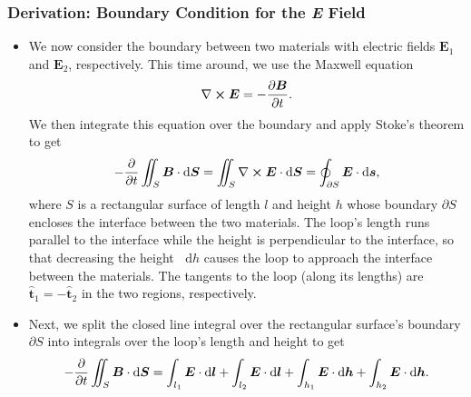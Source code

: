 \documentclass[11pt, a4paper]{article}
\newcommand{\diff}{\mathop{}\!\mathrm{d}} %
\renewcommand{\vec}[1]{\bm{#1}} %
\newcommand{\uvec}[1]{\hat{\vec{#1}}} %
\newcommand{\E}{\vec{E}} %
\newcommand{\B}{\vec{B}} %
\renewcommand{\curl}{\nabla \cross}
\begin{document}
\subsubsection{Derivation: Boundary Condition for the \textit{E} Field}
\begin{itemize}
	\item We now consider the boundary between two materials with electric fields $ \E_{1} $ and $ \E_{2} $, respectively. This time around, we use the Maxwell equation
	\begin{equation*}
		\curl \E = - \pdv{\B}{t}.
	\end{equation*}
	We then integrate this equation over the boundary and apply Stoke's theorem to get
	\begin{equation*}
        - \pdv{t}\iint_{S}\B \cdot \diff \vec{S} = \iint_{S} \curl \E \cdot \diff \vec{S} = \oint_{\partial S} \E \cdot \diff \vec{s},
	\end{equation*}
    where $ S $ is a rectangular surface of length $ l $ and height $ h $ whose boundary $ \partial S $ encloses the interface between the two materials. The loop's length runs parallel to the interface while the height is perpendicular to the interface, so that decreasing the height $ \diff h $ causes the loop to approach the interface between the materials. The tangents to the loop (along its lengths) are $ \uvec{t}_{1} = - \uvec{t}_{2} $ in the two regions, respectively. 
    
    \item Next, we split the closed line integral over the rectangular surface's boundary $ \partial S $ into integrals over the loop's length and height to get
    \begin{equation*}
        - \pdv{t}\iint_{S}\B \cdot \diff \vec{S} = \int_{l_{1}}\E \cdot \diff \vec{l} + \int_{l_{2}}\E \cdot \diff \vec{l} + \int_{h_{1}}\E \cdot \diff \vec{h} + \int_{h_{2}}\E \cdot \diff \vec{h}.
    \end{equation*}
    

\end{itemize}
\end{document}

